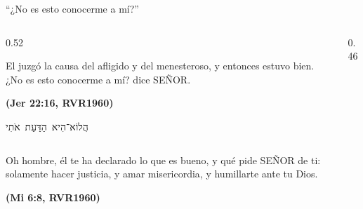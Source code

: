 \documentclass[hyperref={bookmarks=false},aspectratio=169]{beamer}
\newcommand{\heb}[1]{\mbox{\foreignlanguage{hebrew}{#1}}}
\newcommand{\SENOR}{S{\fontsize{0.78em}{1em}\selectfont EÑOR}}
\newcommand{\fuente}[1]{\par\hfill{\upshape\bfseries\footnotesize\textcolor{azul}{#1}}}
\begin{document}
\begin{frame}{``¿No es esto conocerme a mí?''}
\begin{columns}[c,onlytextwidth]
\begin{column}{0.52\textwidth}
\begin{cita}El juzgó la causa del afligido y del menesteroso, y entonces estuvo bien. ¿No es esto conocerme a mí? dice \SENOR.\fuente{(Jer 22:16, RVR1960)}\end{cita}
\begin{center}\small\heb{הֲלוֹא־הִיא הַדַּעַת אֹתִי}\end{center}
\end{column}
\begin{column}{0.46\textwidth}
\centering
{}
\end{column}
\end{columns}\par\medskip
\begin{cita}Oh hombre, él te ha declarado lo que es bueno, y qué pide \SENOR{} de ti: solamente hacer justicia, y amar misericordia, y humillarte ante tu Dios.\fuente{(Mi 6:8, RVR1960)}\end{cita}
\end{frame}
\end{document}
